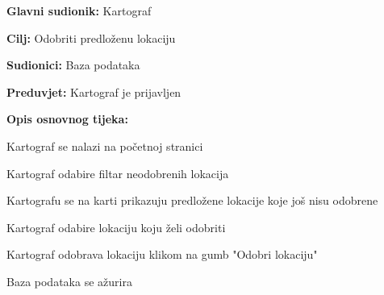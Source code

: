 					\noindent {}
					\begin{packed_item}
	
						\item \textbf{Glavni sudionik: }Kartograf
						\item  \textbf{Cilj:} Odobriti predloženu lokaciju
						\item  \textbf{Sudionici:} Baza podataka
						\item  \textbf{Preduvjet:} Kartograf je prijavljen
						\item  \textbf{Opis osnovnog tijeka:}
						
						\item[] \begin{packed_enum}
	
							\item Kartograf se nalazi na početnoj stranici
							\item Kartograf odabire filtar neodobrenih lokacija
							\item Kartografu se na karti prikazuju predložene lokacije koje još nisu odobrene
							\item Kartograf odabire lokaciju koju želi odobriti
							\item Kartograf odobrava lokaciju klikom na gumb "Odobri lokaciju"
							\item Baza podataka se ažurira

						\end{packed_enum}
						
					\end{packed_item}
					
